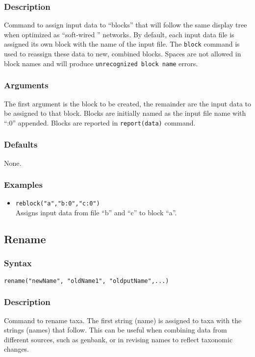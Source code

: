 \documentclass[11pt]{article}
\begin{document}
	\subsubsection{Description}
	Command to assign input data to ``blocks'' that will follow the same display tree when optimized
	as ``soft-wired '' networks.  By default, each input data file is assigned its own block with the name
	of the input file.  The \texttt{block} command is used to reassign these data to new, combined blocks.
	Spaces are not allowed in block names and will produce \texttt{unrecognized block name} errors.    
	\subsubsection{Arguments}
	The first argument is the block to be created, the remainder are the input data to be 
	assigned to that block. Blocks are initially named as the input file name with ``:0'' appended.  Blocks are reported in \texttt{report(data)} command.
	\subsubsection{Defaults}
	None.
	\subsubsection{Examples}
	\begin{itemize}
		\item{\texttt{reblock("a","b:0","c:0")}\\ Assigns input data from file ``b'' and ``c'' to block ``a''. }
	\end{itemize}
	
	\subsection{Rename}
		\subsubsection{Syntax}
			\texttt{rename("newName", "oldName1", "oldputName",...)}
		\subsubsection{Description}
			Command to rename taxa.  The first string (name) is assigned to taxa with the strings (names) that follow. This can be useful when combining data from
			different sources, such as genbank, or in revising names to reflect taxonomic changes.
\end{document}
